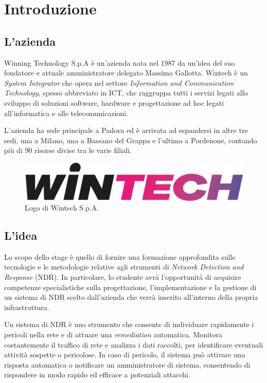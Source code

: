 \chapter{Introduzione}
\label{cap:introduzione}

\section{L'azienda}

Winning Technology S.p.A è un'azienda nata nel 1987 da un'idea del suo fondatore e attuale amministratore delegato Massimo Gallotta. Wintech è un \emph{System Integrator} che opera nel settore \emph{Information and Communication Technology}, spesso abbreviato in ICT, che raggruppa tutti i servizi legati allo sviluppo di soluzioni software, hardware e progettazione ad hoc legati all'informatica e alle telecomunicazioni.

L'azienda ha sede principale a Padova ed è arrivata ad espandersi in altre tre sedi, una a Milano, una a Bassano del Grappa e l'ultima a Pordenone, contando più di 90 risorse divise tra le varie filiali.\cite{site:wtc-dati}

\begin{figure}[htbp]
    \centering
    \includegraphics[width=0.8\linewidth]{images/wtc/logo.png}
    \caption{Logo di Wintech S.p.A.}
    \label{fig:wintech-logo}
\end{figure}


\section{L'idea}

Lo scopo dello stage è quello di fornire una formazione approfondita sulle tecnologie e le metodologie relative agli strumenti di \emph{Network Detection and Response} (NDR). In particolare, lo studente avrà l'opportunità di acquisire competenze specialistiche sulla progettazione, l'implementazione e la gestione di un sistema di NDR scelto dall'azienda che verrà inserito all'interno della propria infrastruttura.

Un sistema di NDR è uno strumento che consente di individuare rapidamente i pericoli nella rete e di attuare una \emph{remediation} automatica. Monitora costantemente il traffico di rete e analizza i dati raccolti, per identificare eventuali attività sospette o pericolose. In caso di pericolo, il sistema può attivare una risposta automatica o notificare un amministratore di sistema, consentendo di rispondere in modo rapido ed efficace a potenziali attacchi.

